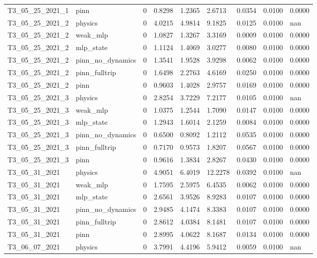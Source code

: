 \begin{table}[t]
\begin{tabular}{lllllllll}
T3\_05\_25\_2021\_1 & pinn & 0 & 0.8298 & 1.2365 & 2.6713 & 0.0354 & 0.0100 & 0.0000 \\
T3\_05\_25\_2021\_2 & physics & 0 & 4.0215 & 4.9814 & 9.1825 & 0.0125 & 0.0100 & nan \\
T3\_05\_25\_2021\_2 & weak\_mlp & 0 & 1.0827 & 1.3267 & 3.3169 & 0.0009 & 0.0100 & 0.0000 \\
T3\_05\_25\_2021\_2 & mlp\_state & 0 & 1.1124 & 1.4069 & 3.0277 & 0.0080 & 0.0100 & 0.0000 \\
T3\_05\_25\_2021\_2 & pinn\_no\_dynamics & 0 & 1.3541 & 1.9528 & 3.9298 & 0.0062 & 0.0100 & 0.0000 \\
T3\_05\_25\_2021\_2 & pinn\_fulltrip & 0 & 1.6498 & 2.2763 & 4.6169 & 0.0250 & 0.0100 & 0.0000 \\
T3\_05\_25\_2021\_2 & pinn & 0 & 0.9603 & 1.4028 & 2.9757 & 0.0169 & 0.0100 & 0.0000 \\
T3\_05\_25\_2021\_3 & physics & 0 & 2.8254 & 3.7229 & 7.2177 & 0.0105 & 0.0100 & nan \\
T3\_05\_25\_2021\_3 & weak\_mlp & 0 & 1.0375 & 1.2544 & 1.7090 & 0.0147 & 0.0100 & 0.0000 \\
T3\_05\_25\_2021\_3 & mlp\_state & 0 & 1.2943 & 1.6014 & 2.1259 & 0.0084 & 0.0100 & 0.0000 \\
T3\_05\_25\_2021\_3 & pinn\_no\_dynamics & 0 & 0.6500 & 0.8092 & 1.2112 & 0.0535 & 0.0100 & 0.0000 \\
T3\_05\_25\_2021\_3 & pinn\_fulltrip & 0 & 0.7170 & 0.9573 & 1.8207 & 0.0567 & 0.0100 & 0.0000 \\
T3\_05\_25\_2021\_3 & pinn & 0 & 0.9616 & 1.3834 & 2.8267 & 0.0430 & 0.0100 & 0.0000 \\
T3\_05\_31\_2021 & physics & 0 & 4.9051 & 6.4019 & 12.2278 & 0.0392 & 0.0100 & nan \\
T3\_05\_31\_2021 & weak\_mlp & 0 & 1.7595 & 2.5975 & 6.4535 & 0.0062 & 0.0100 & 0.0000 \\
T3\_05\_31\_2021 & mlp\_state & 0 & 2.6561 & 3.9526 & 8.9283 & 0.0107 & 0.0100 & 0.0000 \\
T3\_05\_31\_2021 & pinn\_no\_dynamics & 0 & 2.9485 & 4.1474 & 8.3383 & 0.0107 & 0.0100 & 0.0000 \\
T3\_05\_31\_2021 & pinn\_fulltrip & 0 & 2.8612 & 4.0384 & 8.1481 & 0.0107 & 0.0100 & 0.0000 \\
T3\_05\_31\_2021 & pinn & 0 & 2.8995 & 4.0622 & 8.1687 & 0.0134 & 0.0100 & 0.0000 \\
T3\_06\_07\_2021 & physics & 0 & 3.7991 & 4.4196 & 5.9412 & 0.0059 & 0.0100 & nan \\

\end{tabular}
\end{table}
